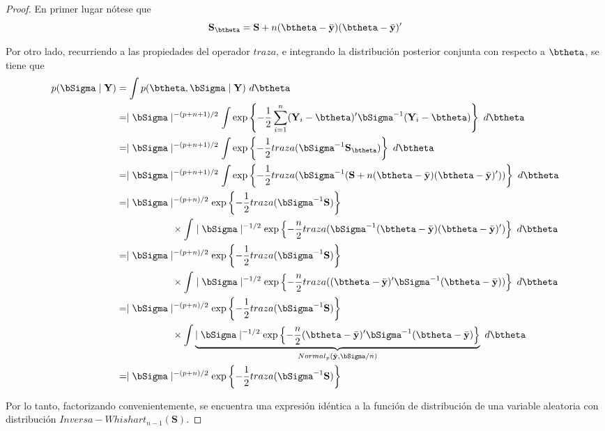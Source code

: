 \begin{proof}
En primer lugar nótese que
\begin{equation*}
\textbf{S}_{\btheta}=\mathbf{S}+n(\btheta-\bar{\mathbf{y}})(\btheta-\bar{\mathbf{y}})'
\end{equation*}

Por otro lado, recurriendo a las propiedades del operador $traza$, e integrando la distribución posterior conjunta con respecto a $\btheta$, se tiene que
\begin{align*}
p(\bSigma \mid \mathbf{Y})&=\int p(\btheta,\bSigma \mid \mathbf{Y}) \ d\btheta\\
&= \mid \bSigma \mid ^{-(p+n+1)/2}\int\exp\left\{ -\frac{1}{2}\sum_{i=1}^n
  (\mathbf{Y}_i-\btheta)'\bSigma^{-1}(\mathbf{Y}_i-\btheta)\right\} \ d\btheta\\
  &= \mid \bSigma \mid ^{-(p+n+1)/2}\int
  \exp\left\{ -\frac{1}{2}traza(\bSigma^{-1}\mathbf{S}_{\btheta})\right\} \ d\btheta\\
  &= \mid \bSigma \mid ^{-(p+n+1)/2}\int
  \exp\left\{ -\frac{1}{2}traza(\bSigma^{-1}
  (\mathbf{S}+n(\btheta-\bar{\mathbf{y}})(\btheta-\bar{\mathbf{y}})'))\right\} \ d\btheta\\
&= \mid \bSigma \mid ^{-(p+n)/2}\exp\left\{ -\frac{1}{2}traza(\bSigma^{-1}\mathbf{S})\right\}\\
&\hspace{2cm}\times
\int \mid \bSigma \mid ^{-1/2}\exp\left\{ -\frac{n}{2}traza(\bSigma^{-1}(\btheta-\bar{\mathbf{y}})(\btheta-\bar{\mathbf{y}})')\right\} \ d\btheta\\
&= \mid \bSigma \mid ^{-(p+n)/2}\exp\left\{ -\frac{1}{2}traza(\bSigma^{-1}\mathbf{S})\right\}\\
&\hspace{2cm}\times\int \mid \bSigma \mid ^{-1/2}\exp\left\{ -\frac{n}{2}traza((\btheta-\bar{\mathbf{y}})'\bSigma^{-1}(\btheta-\bar{\mathbf{y}}))\right\} \ d\btheta\\
&= \mid \bSigma \mid ^{-(p+n)/2}\exp\left\{ -\frac{1}{2}traza(\bSigma^{-1}\mathbf{S})\right\}\\
&\hspace{2cm}\times
\int\underbrace{ \mid \bSigma \mid ^{-1/2}\exp\left\{ -\frac{n}{2}(\btheta-\bar{\mathbf{y}})'\bSigma^{-1}(\btheta-\bar{\mathbf{y}})\right\}}_{Normal_p(\bar{\mathbf{y}},\bSigma/n)} \ d\btheta\\
&= \mid \bSigma \mid ^{-(p+n)/2}\exp\left\{ -\frac{1}{2}traza(\bSigma^{-1}\mathbf{S})\right\}
\end{align*}

Por lo tanto, factorizando convenientemente, se encuentra una expresión idéntica a la función de distribución de una variable aleatoria con distribución $Inversa-Whishart_{n-1}(\mathbf{S})$.
\end{proof}

